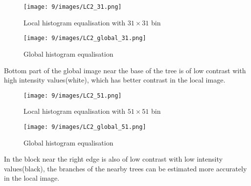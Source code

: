 \documentclass[12pt]{article}
\begin{document}
\begin{itemize}
    
    \begin{figure}[H]
        \centering
        \begin{minipage}{.45\textwidth}
          \centering
          \texttt{[image: 9/images/LC2\_31.png]}
          \caption*{Local histogram equalisation with $31\times 31$ bin}
          \label{fig:totalpowervst}
        \end{minipage}
        \begin{minipage}{.45\textwidth}
          \centering
          \texttt{[image: 9/images/LC2\_global\_31.png]}
          \caption*{Global histogram equalisation}
          \label{fig:totalpower2}
        \end{minipage}
        \label{fig:totalPower}
    \end{figure}
    Bottom part of the global image near the base of the tree is of low contrast with high intensity values(white), which has better contrast in the local image.
    
    \begin{figure}[H]
        \centering
        \begin{minipage}{.45\textwidth}
          \centering
          \texttt{[image: 9/images/LC2\_51.png]}
          \caption*{Local histogram equalisation with $51\times 51$ bin}
          \label{fig:totalpowervst}
        \end{minipage}
        \begin{minipage}{.45\textwidth}
          \centering
          \texttt{[image: 9/images/LC2\_global\_51.png]}
          \caption*{Global histogram equalisation}
          \label{fig:totalpower2}
        \end{minipage}
        \label{fig:totalPower}
    \end{figure}
    In the block near the right edge is also of low contrast with low intensity values(black), the branches of the nearby trees can be estimated more accurately in the local image. 
    

\end{itemize}
\end{document}
